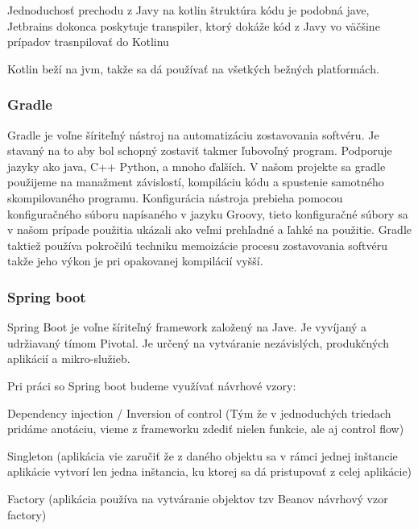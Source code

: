   

Jednoduchosť prechodu z Javy na kotlin štruktúra kódu je podobná jave, Jetbrains dokonca poskytuje transpiler, ktorý dokáže kód z Javy vo väčšine prípadov trasnpilovať do Kotlinu 

Kotlin beží na \acrshort{jvm}, takže sa dá používať na všetkých bežných platformách. 

  

\subsubsection{Gradle} 

Gradle je voľne šíriteľný nástroj na automatizáciu zostavovania softvéru. Je stavaný na to aby bol schopný zostaviť takmer ľubovoľný program. Podporuje jazyky ako java, C++ Python, a mnoho ďalších. V našom projekte sa gradle použijeme na manažment závislostí, kompiláciu kódu a spustenie samotného skompilovaného programu. Konfigurácia nástroja prebieha pomocou konfiguračného súboru napísaného v jazyku Groovy, tieto konfiguračné  súbory sa v našom prípade použitia ukázali ako veľmi prehľadné a ľahké na použitie. Gradle taktiež používa pokročilú techniku memoizácie procesu zostavovania softvéru takže jeho výkon je pri opakovanej kompilácií vyšší.

 
  

  

\subsubsection{Spring boot} 

 Spring Boot je voľne šíriteľný framework založený na Jave. Je vyvíjaný a udržiavaný tímom Pivotal. Je určený na vytváranie nezávislých, produkčných aplikácií a mikro-služieb.

Pri práci so Spring boot budeme využívať návrhové vzory: 

Dependency injection / Inversion of control (Tým že v jednoduchých triedach pridáme anotáciu, vieme z frameworku zdediť nielen funkcie, ale aj control flow)  

  

Singleton (aplikácia vie zaručiť že z daného objektu sa v rámci jednej inštancie aplikácie vytvorí len jedna inštancia, ku ktorej sa dá pristupovať z celej aplikácie) 

  

Factory (aplikácia používa na vytváranie objektov tzv Beanov návrhový vzor factory) 

